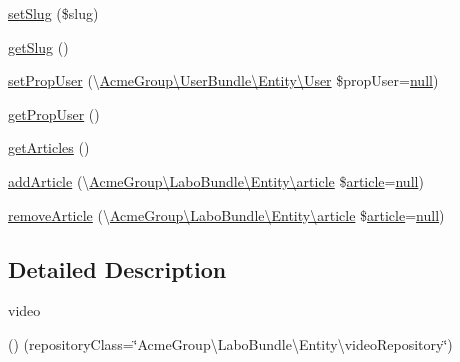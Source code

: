 \begin{DoxyCompactItemize}
\item 
\hyperlink{class_acme_group_1_1_labo_bundle_1_1_entity_1_1video_abdccfd01f66ac97feb2a0d7f79d02fe4}{set\+Slug} (\$slug)
\item 
\hyperlink{class_acme_group_1_1_labo_bundle_1_1_entity_1_1video_ac419632b6986358bad5ac9fa054af0bc}{get\+Slug} ()
\item 
\hyperlink{class_acme_group_1_1_labo_bundle_1_1_entity_1_1video_a4dda23962f37f8cfe6844d72f91ffd73}{set\+Prop\+User} (\textbackslash{}\hyperlink{class_acme_group_1_1_user_bundle_1_1_entity_1_1_user}{Acme\+Group\textbackslash{}\+User\+Bundle\textbackslash{}\+Entity\textbackslash{}\+User} \$prop\+User=\hyperlink{validate_8js_afb8e110345c45e74478894341ab6b28e}{null})
\item 
\hyperlink{class_acme_group_1_1_labo_bundle_1_1_entity_1_1video_a48104bf753c972375e798e343a869763}{get\+Prop\+User} ()
\item 
\hyperlink{class_acme_group_1_1_labo_bundle_1_1_entity_1_1video_a55b330236c1c29e8f8d575a31deefbac}{get\+Articles} ()
\item 
\hyperlink{class_acme_group_1_1_labo_bundle_1_1_entity_1_1video_ab65ed53c65b4dc21f2cb38a1471ac22b}{add\+Article} (\textbackslash{}\hyperlink{class_acme_group_1_1_labo_bundle_1_1_entity_1_1article}{Acme\+Group\textbackslash{}\+Labo\+Bundle\textbackslash{}\+Entity\textbackslash{}article} \$\hyperlink{class_acme_group_1_1_labo_bundle_1_1_entity_1_1article}{article}=\hyperlink{validate_8js_afb8e110345c45e74478894341ab6b28e}{null})
\item 
\hyperlink{class_acme_group_1_1_labo_bundle_1_1_entity_1_1video_a85da27612e5c1b12e51ead1b9b508911}{remove\+Article} (\textbackslash{}\hyperlink{class_acme_group_1_1_labo_bundle_1_1_entity_1_1article}{Acme\+Group\textbackslash{}\+Labo\+Bundle\textbackslash{}\+Entity\textbackslash{}article} \$\hyperlink{class_acme_group_1_1_labo_bundle_1_1_entity_1_1article}{article}=\hyperlink{validate_8js_afb8e110345c45e74478894341ab6b28e}{null})
\end{DoxyCompactItemize}


\subsection{Detailed Description}
video

() (repository\+Class=\char`\"{}\+Acme\+Group\textbackslash{}\+Labo\+Bundle\textbackslash{}\+Entity\textbackslash{}video\+Repository\char`\"{}) 

